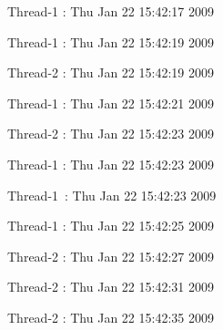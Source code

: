\documentclass [12pt,a4paper,notitlepage,oneside,bahasa]{article}
\begin{document}
\vspace{10pt}
\noindent 
\begin{center}{\fontsize{10pt}{10pt}\selectfont Thread-1 : Thu Jan 22 15:42:17 2009}\end{center} \par
\noindent 
\begin{center}{\fontsize{10pt}{10pt}\selectfont Thread-1 : Thu Jan 22 15:42:19 2009}\end{center} \par
\noindent 
\begin{center}{\fontsize{10pt}{10pt}\selectfont Thread-2 : Thu Jan 22 15:42:19 2009}\end{center} \par
\noindent 
\begin{center}{\fontsize{10pt}{10pt}\selectfont Thread-1 : Thu Jan 22 15:42:21 2009}\end{center} \par
\noindent 
\begin{center}{\fontsize{10pt}{10pt}\selectfont Thread-2 : Thu Jan 22 15:42:23 2009}\end{center} \par
\noindent 
\begin{center}{\fontsize{10pt}{10pt}\selectfont Thread-1 : Thu Jan 22 15:42:23 2009}\end{center} \par
\noindent 
\begin{center}{\fontsize{10pt}{10pt}\selectfont Thread-1~:  Thu Jan 22 15:42:23 2009}\end{center} \par
\noindent 
\begin{center}{\fontsize{10pt}{10pt}\selectfont Thread-1 : Thu Jan 22 15:42:25 2009}\end{center} \par
\noindent 
\begin{center}{\fontsize{10pt}{10pt}\selectfont Thread-2 : Thu Jan 22 15:42:27 2009}\end{center} \par
\noindent 
\begin{center}{\fontsize{10pt}{10pt}\selectfont Thread-2 : Thu Jan 22 15:42:31 2009}\end{center} \par
\noindent 
\begin{center}{\fontsize{10pt}{10pt}\selectfont Thread-2 : Thu Jan 22 15:42:35 2009}\end{center} \par
\end{document}
